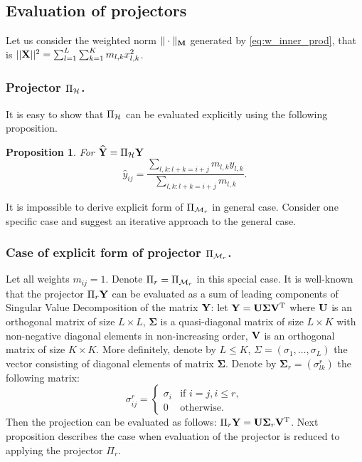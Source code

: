 \documentclass[sii]{ipart}
\newtheorem{proposition}{Proposition}
\begin{document}
\subsection{Evaluation of projectors}

Let us consider the weighted norm $\|\cdot\|_{\mathbf{M}}$ generated by \eqref{eq:w_inner_prod}, that is $||\mathbf{X}||^2 = \sum_{l = 1}^L \sum_{k = 1}^K m_{l, k} x^2_{l, k}$.

\subsubsection{Projector $\Pi_{\mathcal{H}}$.} It is easy to show that $\Pi_{\mathcal{H}}$
can be evaluated explicitly using the following proposition.

\begin{proposition}
	For $\widehat{\mathbf{Y}}=\Pi_{\mathcal{H}} \mathbf{Y}$
	\begin{equation*}
	\hat{y}_{ij} = \frac{\sum_{l,k: l+k=i+j} m_{l,k} y_{l,k}}{\sum_{l,k: l+k=i+j} m_{l,k}}.
	\end{equation*}
\end{proposition}

It is impossible to derive explicit form of $\Pi_{\mathcal{M}_r}$ in general case.
Consider one specific case and suggest an iterative approach to the general case.

\subsubsection{Case of explicit form of projector $\Pi_{\mathcal{M}_r}$.}
Let all weights $m_{ij}=1$. Denote $\Pi_r=\Pi_{\mathcal{M}_r}$ in this special case.
It is well-known that the projector $\Pi_{r} \mathbf{Y}$ can be evaluated as a sum of leading components of Singular Value Decomposition of the matrix $\mathbf{Y}$: let $\mathbf{Y} = \mathbf{U} \mathbf{\Sigma} \mathbf{V}^{\mathrm{T}}$ where $\mathbf{U}$ is an orthogonal matrix of size $L \times L$, $\mathbf{\Sigma}$ is a quasi-diagonal matrix of size $L \times K$ with non-negative diagonal elements in non-increasing order, $\mathbf{V}$ is an orthogonal matrix of size $K \times K$. More definitely, denote by $L\le K$, $\Sigma = (\sigma_1, \ldots, \sigma_L)$ the vector consisting of diagonal elements of matrix $\mathbf{\Sigma}$. Denote by $\mathbf{\Sigma}_r = (\sigma^r_{l k})$ the following matrix:
\begin{equation*}
\sigma^r_{i j} = \begin{cases}
\sigma_i & \text{if $i = j, i \le r,$}\\
0 & \text{otherwise}.
\end{cases}
\end{equation*}
Then the projection can be evaluated as follows: $\Pi_{r} \mathbf{Y}  = \mathbf{U} \mathbf{\Sigma}_r \mathbf{V}^{\mathrm{T}}$.
Next proposition describes the case when evaluation of the projector is reduced to applying the projector  $\Pi_r$.
\end{document}
